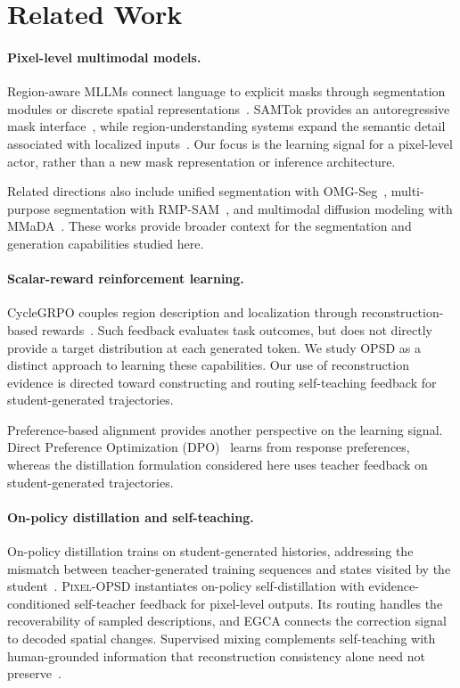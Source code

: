 \documentclass{article}
\newcommand{\ours}{\textsc{Pixel-OPSD}}
\begin{document}
\section{Related Work}
\paragraph{Pixel-level multimodal models.}
Region-aware MLLMs connect language to explicit masks through segmentation modules or discrete spatial representations~\citep{lai2024lisa,li2024pixellm,rasheed2024glamm,you2024ferret,yuan2024osprey}. SAMTok provides an autoregressive mask interface~\citep{zhou2026samtok}, while region-understanding systems expand the semantic detail associated with localized inputs~\citep{wang2026gar}. Our focus is the learning signal for a pixel-level actor, rather than a new mask representation or inference architecture.

Related directions also include unified segmentation with OMG-Seg~\citep{li2024omgseg}, multi-purpose segmentation with RMP-SAM~\citep{li2025rmpsam}, and multimodal diffusion modeling with MMaDA~\citep{tian2026mmada}. These works provide broader context for the segmentation and generation capabilities studied here.

\paragraph{Scalar-reward reinforcement learning.}
CycleGRPO couples region description and localization through reconstruction-based rewards~\citep{zhang2026cyclegrpo}. Such feedback evaluates task outcomes, but does not directly provide a target distribution at each generated token. We study OPSD as a distinct approach to learning these capabilities. Our use of reconstruction evidence is directed toward constructing and routing self-teaching feedback for student-generated trajectories.

Preference-based alignment provides another perspective on the learning signal. Direct Preference Optimization (DPO)~\citep{rafailov2023dpo} learns from response preferences, whereas the distillation formulation considered here uses teacher feedback on student-generated trajectories.

\paragraph{On-policy distillation and self-teaching.}
On-policy distillation trains on student-generated histories, addressing the mismatch between teacher-generated training sequences and states visited by the student~\citep{agarwal2024gkd,gu2024minillm,ko2024distillm}. \ours{} instantiates on-policy self-distillation with evidence-conditioned self-teacher feedback for pixel-level outputs. Its routing handles the recoverability of sampled descriptions, and EGCA connects the correction signal to decoded spatial changes. Supervised mixing complements self-teaching with human-grounded information that reconstruction consistency alone need not preserve~\citep{wang2024qwen2vl,liu2023llava,liu2023llava1p5,ouyang2022instructgpt}.
\end{document}
